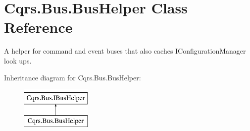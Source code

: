 \hypertarget{classCqrs_1_1Bus_1_1BusHelper}{}\section{Cqrs.\+Bus.\+Bus\+Helper Class Reference}
\label{classCqrs_1_1Bus_1_1BusHelper}


A helper for command and event buses that also caches I\+Configuration\+Manager look ups.  


Inheritance diagram for Cqrs.\+Bus.\+Bus\+Helper\+:\begin{figure}[H]
\begin{center}
\leavevmode
\includegraphics[height=2.000000cm]{classCqrs_1_1Bus_1_1BusHelper}
\end{center}
\end{figure}
